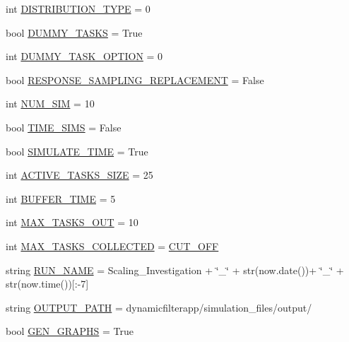 \begin{DoxyCompactItemize}
\item 
int \hyperlink{namespacereorder_aceed21fa0675802d2f756c7da43cb049}{D\+I\+S\+T\+R\+I\+B\+U\+T\+I\+O\+N\+\_\+\+T\+Y\+PE} = 0
\item 
bool \hyperlink{namespacereorder_a16edb4f07d82f0494347a0977663e6f4}{D\+U\+M\+M\+Y\+\_\+\+T\+A\+S\+KS} = True
\item 
int \hyperlink{namespacereorder_a0b87eab5c4f4f0b986a43805f825d2c6}{D\+U\+M\+M\+Y\+\_\+\+T\+A\+S\+K\+\_\+\+O\+P\+T\+I\+ON} = 0
\item 
bool \hyperlink{namespacereorder_a1f569cdee80dfd4d7a2d7a3f3aebc47f}{R\+E\+S\+P\+O\+N\+S\+E\+\_\+\+S\+A\+M\+P\+L\+I\+N\+G\+\_\+\+R\+E\+P\+L\+A\+C\+E\+M\+E\+NT} = False
\item 
int \hyperlink{namespacereorder_a3baf5565851cd87736238d8dddfc1106}{N\+U\+M\+\_\+\+S\+IM} = 10
\item 
bool \hyperlink{namespacereorder_a3dd608f63971ae7536ce7be96396c510}{T\+I\+M\+E\+\_\+\+S\+I\+MS} = False
\item 
bool \hyperlink{namespacereorder_af689b6dbf6a3a082bbfb9f6decf1a805}{S\+I\+M\+U\+L\+A\+T\+E\+\_\+\+T\+I\+ME} = True
\item 
int \hyperlink{namespacereorder_a374727dba0574510b39c1e2871f69e48}{A\+C\+T\+I\+V\+E\+\_\+\+T\+A\+S\+K\+S\+\_\+\+S\+I\+ZE} = 25
\item 
int \hyperlink{namespacereorder_a04a9eab148403f1f27d44b38211aad04}{B\+U\+F\+F\+E\+R\+\_\+\+T\+I\+ME} = 5
\item 
int \hyperlink{namespacereorder_a27cea6b210bbcb9af3fbd7edc3901390}{M\+A\+X\+\_\+\+T\+A\+S\+K\+S\+\_\+\+O\+UT} = 10
\item 
int \hyperlink{namespacereorder_aa05c90c0672e9b74717bdeabb00fd1bb}{M\+A\+X\+\_\+\+T\+A\+S\+K\+S\+\_\+\+C\+O\+L\+L\+E\+C\+T\+ED} = \hyperlink{namespacereorder_a914791c176a78c026dc76a18bcd88d73}{C\+U\+T\+\_\+\+O\+FF}
\item 
string \hyperlink{namespacereorder_a1e90a00628c373ad2f7e63b20ba08b9c}{R\+U\+N\+\_\+\+N\+A\+ME} = \textquotesingle{}Scaling\+\_\+\+Investigation\textquotesingle{} + \char`\"{}\+\_\+\char`\"{} + str(now.\+date())+ \char`\"{}\+\_\+\char`\"{} + str(now.\+time())\mbox{[}\+:-\/7\mbox{]}
\item 
string \hyperlink{namespacereorder_a04644ded1d5e3fc8bd58a411209b7886}{O\+U\+T\+P\+U\+T\+\_\+\+P\+A\+TH} = \textquotesingle{}dynamicfilterapp/simulation\+\_\+files/output/\textquotesingle{}
\item 
bool \hyperlink{namespacereorder_a57c1e3f291181d680f3ee118fa5c4ab8}{G\+E\+N\+\_\+\+G\+R\+A\+P\+HS} = True

\end{DoxyCompactItemize}
